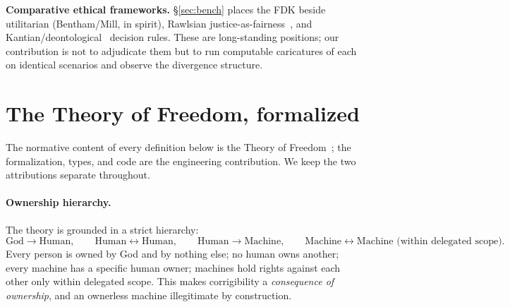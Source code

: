 \documentclass[11pt]{article}
\begin{document}
\textbf{Comparative ethical frameworks.} \S\ref{sec:bench} places the FDK beside utilitarian
(Bentham/Mill, in spirit), Rawlsian justice-as-fairness~\citep{rawls1971}, and
Kantian/deontological~\citep{kant1785} decision rules. These are long-standing positions; our
contribution is not to adjudicate them but to run computable caricatures of each on identical
scenarios and observe the divergence structure.

\section{The Theory of Freedom, formalized}
\label{sec:formal}

The normative content of every definition below is the Theory of
Freedom~\citep{jannatkhahdoust}; the formalization, types, and code are the engineering
contribution. We keep the two attributions separate throughout.

\paragraph{Ownership hierarchy.} The theory is grounded in a strict hierarchy:
\[
\text{God} \to \text{Human}, \qquad
\text{Human} \leftrightarrow \text{Human}, \qquad
\text{Human} \to \text{Machine}, \qquad
\text{Machine} \leftrightarrow \text{Machine (within delegated scope)} .
\]
Every person is owned by God and by nothing else; no human owns another; every machine has a
specific human owner; machines hold rights against each other only within delegated scope.
This makes corrigibility a \emph{consequence of ownership}, and an ownerless machine
illegitimate by construction.
\end{document}
